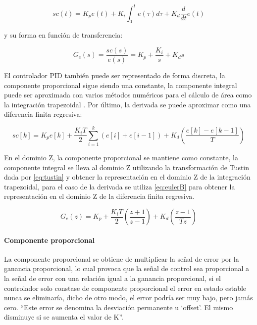             \begin{equation}\label{eq:pidtiempo}
                sc(t) = K_{p}e(t)+  K_{i}\int_{0}^{t} e(\tau) d\tau + K_{d} \frac{d}{dt}e(t)
            \end{equation}
            
            \noindent y su forma en función de transferencia:
            
            \begin{equation}\label{eq:pidcompleja}
                G_{c}(s) = \frac{sc(s)}{e(s)} = K_p + \frac{K_i}{s} + K_d s
            \end{equation}
            
            El controlador PID también puede ser representado de forma discreta, la componente proporcional sigue siendo una constante, la componente integral puede ser aproximada con varios métodos numéricos para el cálculo de área como la integración trapezoidal \Parencite{kuo1996sistemas}. Por último, la derivada se puede aproximar como una diferencia finita regresiva:

            \begin{equation}\label{eq:pidcdiscreto}
                sc[k] = K_{p}e[k]+  \dfrac{K_{i}T}{2}\sum_{i=1}^{k}\left(e[i] + e[i-1]\right) + K_{d} \left(\frac{e[k]- e[k-1]}{T}\right)
            \end{equation}

            En el dominio Z, la componente proporcional se mantiene como constante, la componente integral se lleva al dominio Z utilizando la transformación de Tustin dada por \cref{eq:tustin} y obtener la representación en el dominio Z de la integración trapezoidal, para el caso de la derivada se utiliza \cref{eq:eulerB} para obtener la representación en el dominio Z de la diferencia finita regresiva.

            \begin{equation}\label{eq:pidenZ}
                G_{c}(z) = K_{p} + \frac{K_{i}T}{2}\left(\frac{z+1}{z-1}\right) + K_{d} \left(\frac{z-1}{Tz}\right)
            \end{equation}

            \paragraph{Componente proporcional}

				La componente proporcional se obtiene de multiplicar la señal de error por la ganancia proporcional, lo cual provoca que la señal de control sea proporcional a la señal de error con una relación igual a la ganancia proporcional, si el controlador solo constase de componente proporcional el error en estado estable nunca se eliminaría, dicho de otro modo, el error podría ser muy bajo, pero jamás cero. \enquote{Este error se denomina la desviación permanente u \enquote{offset}. El mismo disminuye si se aumenta el valor de K}\Parencite[p.$\,$54]{nelson1999fundamentos}.


